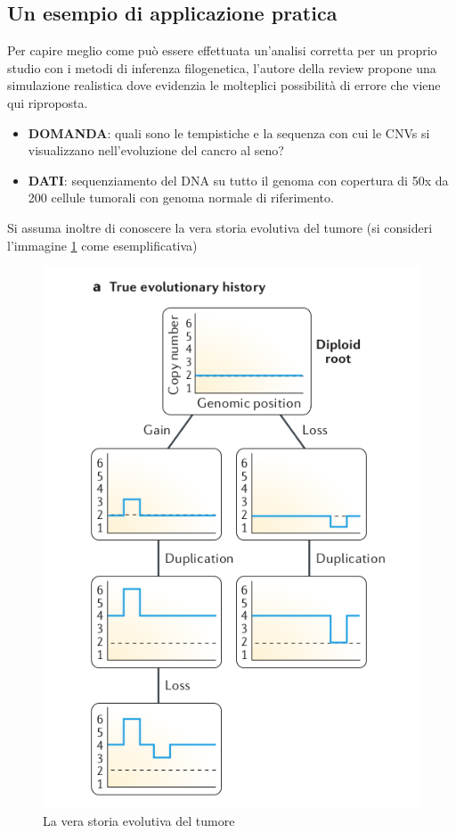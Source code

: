 \documentclass[a4paper]{article}
\begin{document}
	\subsection{\large Un esempio di applicazione pratica}
	Per capire meglio come può essere effettuata un'analisi corretta per un proprio studio con i metodi di
	inferenza filogenetica, l'autore della review propone una simulazione realistica dove evidenzia le molteplici possibilità di
	errore che viene qui riproposta. 

	\begin{itemize}
	\item \textbf{DOMANDA}: quali sono le tempistiche e la sequenza con cui le CNVs si visualizzano nell'evoluzione del
	cancro al seno?
	\item \textbf{DATI}: sequenziamento del DNA su tutto il genoma con copertura di 50x da 200 cellule tumorali con
	genoma normale di riferimento.
	\end{itemize}

	Si assuma inoltre di conoscere la vera storia evolutiva del tumore (si consideri l'immagine \ref{fig:EsNormale} come 
	esemplificativa) 

	\begin{figure}[H]
	  \centering
	  \includegraphics[scale=0.3, keepaspectratio]{EsNormale.png}%
	  \captionsetup{justification=centering,margin=0.5cm}
	  \caption{La vera storia evolutiva del tumore} \label{fig:EsNormale}
	\end{figure} 
\end{document}
